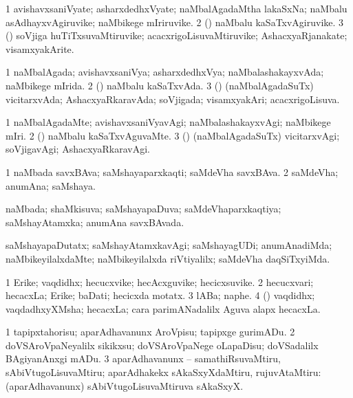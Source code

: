 \bentry
{}
\gl{\nA}
\bmng
\bnum
\num{1} avishavxsaniVyate; asharxdedhxVyate; naMbalAgadaMtha lakaSxNa; naMbalu asAdhayxvAgiruvike; naMbikege mIriruvike. 
\num{2} (\AmA) naMbalu kaSaTxvAgiruvike. 
\num{3} (\AmA) soVjiga huTiTxsuvaMtiruvike; acacxrigoLisuvaMtiruvike; AshacxyaRjanakate; visamxyakArite. 
\enum
\emng
\eentry

\bentry
{}
\gl{\gu}
\bmng
\bnum
\num{1} naMbalAgada; avishavxsaniVya; asharxdedhxVya; naMbalashakayxvAda; naMbikege mIrida. 
\num{2} (\AmA) naMbalu kaSaTxvAda. 
\num{3} (\AmA) (naMbalAgadaSuTx) vicitarxvAda; AshacxyaRkaravAda; soVjigada; visamxyakAri; acacxrigoLisuva. 
\enum
\emng
\eentry

\bentry
{}
\gl{\kirxvi}
\bmng
\bnum
\num{1} naMbalAgadaMte; avishavxsaniVyavAgi; naMbalashakayxvAgi; naMbikege mIri. 
\num{2} (\AmA) naMbalu kaSaTxvAguvaMte. 
\num{3} (\AmA) (naMbalAgadaSuTx) vicitarxvAgi; soVjigavAgi; AshacxyaRkaravAgi. 
\enum
\emng
\eentry

\bentry
{}
\gl{\nA}
\bmng
\bnum
\num{1} naMbada savxBAva; saMshayaparxkaqti; saMdeVha savxBAva. 
\num{2} saMdeVha; anumAna; saMshaya. 
\enum
\emng
\eentry

\bentry
{}
\gl{\gu}
\bmng
naMbada; shaMkisuva; saMshayapaDuva; saMdeVhaparxkaqtiya; saMshayAtamxka; anumAna savxBAvada. 
\emng
\eentry

\bentry
{}
\gl{\kirxvi}
\bmng
saMshayapaDutatx; saMshayAtamxkavAgi; saMshayagUDi; anumAnadiMda; naMbikeyilalxdaMte; naMbikeyilalxda riVtiyalilx; saMdeVha daqSiTxyiMda. 
\emng
\eentry

\bentry
{}
\gl{\nA}
\bmng
\bnum
\num{1} Erike; vaqdidhx; hecucxvike; hecAcxguvike; hecicxsuvike. 
\num{2} hecucxvari; hecacxLa; Erike; baDati; hecicxda motatx. 
\num{3} lABa; naphe. 
\num{4} (\ga) vaqdidhx; vaqdadhxyXMsha; hecacxLa; cara parimANadalilx Aguva alapx hecacxLa. 
\enum
\emng
\eentry

\bentry
{}
\gl{\sakirx}
\bmng
\bnum
\num{1} tapipxtahorisu; aparAdhavanunx AroVpisu; tapipxge gurimADu. 
\num{2} doVSAroVpaNeyalilx sikikxsu; doVSAroVpaNege oLapaDisu; doVSadalilx BAgiyanAnxgi mADu. 
\num{3} aparAdhavanunx -- samathiRsuvaMtiru, sAbiVtugoLisuvaMtiru; aparAdhakekx sAkaSxyXdaMtiru, rujuvAtaMtiru:  (aparAdhavanunx) sAbiVtugoLisuvaMtiruva sAkaSxyX. 
\enum
\emng
\eentry

